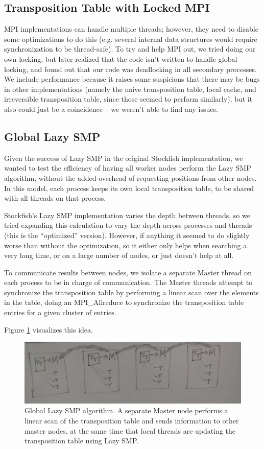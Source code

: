 \documentclass{article}
\begin{document}
\subsection{Transposition Table with Locked MPI}
MPI implementations can handle multiple threads; however, they need to disable
some optimizations to do this (e.g. several internal data structures would
require synchronization to be thread-safe). To try and help MPI out, we tried
doing our own locking, but later realized that the code isn't written to handle
global locking, and found out that our code was deadlocking in all secondary
processes. We include performance because it raises some suspicions that there
may be bugs in other implementations (namely the naive transposition table,
local cache, and irreversible transposition table, since those seemed to perform
similarly), but it also could just be a coincidence -- we weren't able to find
any issues.

\subsection{Global Lazy SMP}
Given the success of Lazy SMP in the original Stockfish implementation, we
wanted to test the efficiency of having all worker nodes perform the Lazy SMP
algorithm, without the added overhead of requesting positions from other nodes.
In this model, each process keeps its own local transposition table, to be
shared with all threads on that process.

Stockfish's Lazy SMP implementation varies the depth between threads, so we
tried expanding this calculation to vary the depth across processes and threads
(this is the ``optimized'' version). However, if anything it seemed to do
slightly worse than without the optimization, so it either only helps when
searching a very long time, or on a large number of nodes, or just doesn't help
at all.

To communicate results between nodes,
we isolate a separate Master thread on each process to be in charge of
communication. The Master threads attempt to synchronize the transposition table
by performing a linear scan over the elements in the table, doing an
{MPI\_Allreduce} to synchronize the transposition table entries for a given
cluster of entries.

Figure \ref{fig:diagram}
visualizes this idea.

\begin{figure}[t]
	\includegraphics[width=\textwidth]{diagram}
	\caption{Global Lazy SMP algorithm. A separate Master node performs a
	linear scan of the transposition table and sends information to other
	master nodes, at the same time that local threads are updating the
	transposition table using Lazy SMP.}
	\label{fig:diagram}
\end{figure}
\end{document}
